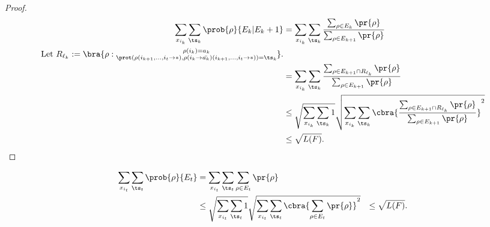 \begin{proof}
    
    \begin{align*}
    \sum_{x_{i_k}} \sum_{\ts_k} \prob{\rho}{E_k|E_k+1}
        &= \sum_{x_{i_k}} 
            \sum_{\ts_k} 
                \frac{
                    \sum_{\rho \in E_k} 
                        \pr{\rho}
                }{
                \sum_{\rho \in E_{k+1}} 
                    \pr{\rho}
                }\\                          
\text{Let } R_{\ell_k} := \bra{\rho:\Rlk}.\\                
        &= \sum_{x_{i_k}} 
            \sum_{\ts_k} 
                \frac{
                    \sum_{
                        \rho \in E_{k+1} \cap R_{\ell_k}    
                    } 
                        \pr{\rho}
                }{
                \sum_{\rho \in E_{k+1}} 
                    \pr{\rho}
                }\\        
        &\leq \sqrt{
                \sum_{x_{i_k}} 
                    \sum_{\ts_k} 
                        1
                } 
        \sqrt{
            \sum_{x_{i_k}} 
                \sum_{\ts_k}
                    \cbra{
                        \frac{
                            \sum_{\rho \in E_{k+1} \cap R_{\ell_k}} \pr{\rho}
                        }{
                            \sum_{\rho \in E_{k+1}} \pr{\rho}
                        }    
                    }^2
        } \\
        &\leq \sqrt{L(F)}.
    \end{align*}
\end{proof}

\begin{claim}
        
\end{claim}


\begin{align*}
    \sum_{x_{i_t}} \sum_{\ts_t} \prob{\rho}{E_t}
        &= \sum_{x_{i_t}} \sum_{\ts_t} \sum_{\rho \in E_t} \pr{\rho}\\
        &\leq \sqrt{
                \sum_{x_{i_t}} 
                    \sum_{\ts_t} 
                        1
                } 
        \sqrt{
            \sum_{x_{i_t}} 
                \sum_{\ts_t}
                    \cbra{\sum_{\rho \in E_t} \pr{\rho}}^2
        } 
        &\leq \sqrt{L(F)}.
    \end{align*}

